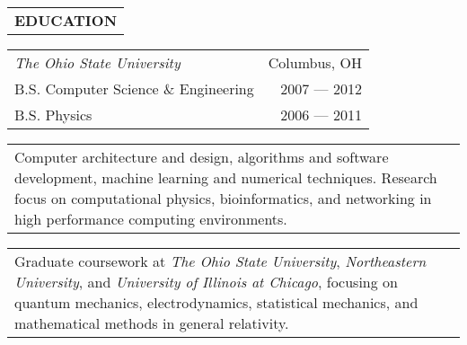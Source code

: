 \begin{tabularx}{\textwidth}{L}
    \textbf{EDUCATION}
\end{tabularx}

\begin{small}

\begin{tabularx}{\textwidth}{L R}
    \normalsize\textit{The Ohio State University} & Columbus, OH \\
    \hspace{10pt}B.S. Computer Science \& Engineering & 2007 --- 2012 \\
    \hspace{10pt}B.S. Physics & 2006 --- 2011 \\
\end{tabularx}
\begin{tabularx}{\textwidth}{X}
    \vspace{1pt}
    Computer architecture and design, algorithms and software development, machine learning and numerical techniques.
    Research focus on computational physics, bioinformatics, and networking in high performance computing environments.
\end{tabularx}
\begin{tabularx}{\textwidth}{X}
    \vspace{1pt}
    Graduate coursework at \textit{The Ohio State University}, \textit{Northeastern University}, and \textit{University of Illinois at Chicago},
    focusing on quantum mechanics, electrodynamics, statistical mechanics, and mathematical methods in general relativity.
\end{tabularx}

\end{small}
